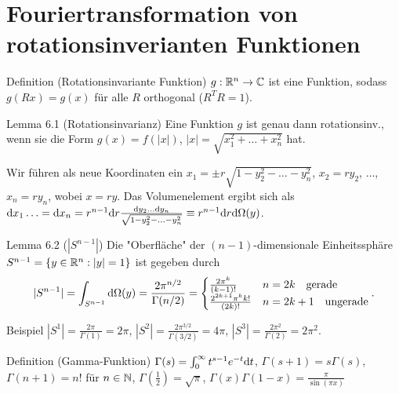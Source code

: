 \section{Fouriertransformation von rotationsinverianten Funktionen}

\begin{namedtheorem}{Definition (Rotationsinvariante Funktion)}
  $g:\mathbb{R}^n\rightarrow\mathbb{C}$ ist eine Funktion, sodass $g(Rx)=g(x)$ für alle $R$ orthogonal ($R^TR=1$).
\end{namedtheorem}

\begin{namedtheorem}{Lemma 6.1 (Rotationsinvarianz)}
  Eine Funktion $g$ ist genau dann rotationsinv., wenn sie die Form $g(x) = f(|x|)$, $|x| = \sqrt{x_1^2+\ldots+x_n^2}$ hat.
\end{namedtheorem}

Wir führen als neue Koordinaten ein $x_1 = \pm r\sqrt{1-y_2^2-\ldots-y_n^2}$, $x_2=ry_2$, $\ldots$, $x_n=ry_n$, wobei $x=ry$. Das Volumenelement ergibt sich als $\mathrm{d} x_1 \ldots = \mathrm{d} x_n = r^{n-1}\mathrm{d} r\frac{\mathrm{d} y_2 \ldots \mathrm{d} y_n}{\sqrt{1-y_2^2-\ldots-y_n^2}}\equiv r^{n-1}\mathrm{d} r \mathrm{d}\Omega(y)$.

\begin{namedtheorem}{Lemma 6.2 ($|S^{n-1}|$)}
  Die "Oberfläche" der $(n-1)$-dimensionale Einheitssphäre $S^{n-1} = \{y\in\mathbb{R}^n: |y| = 1\}$ ist gegeben durch
  \begin{align*}
    |S^{n-1}| = \int_{S^{n-1}} \mathrm{d} \Omega(y) = \frac{2\pi^{n/2}}{\Gamma(n/2)} = \begin{cases}
      \frac{2\pi^k}{(k-1)!} & n=2k \quad \text{gerade} \\
      \frac{2^{2k+1}\pi^kk!}{(2k)!} & n = 2k+1 \quad \text{ungerade}
    \end{cases}.
  \end{align*}
\end{namedtheorem}

\begin{namedtheorem}{Beispiel}
  $|S^1|=\frac{2\pi}{\Gamma(1)}=2\pi$, $|S^2|=\frac{2\pi^{3/2}}{\Gamma(3/2)}=4\pi$, $|S^3|=\frac{2\pi^2}{\Gamma(2)}=2\pi^2$.
\end{namedtheorem}

\begin{namedtheorem}{Definition (Gamma-Funktion)}
  $\Gamma(s)=\int_0^{\infty}t^{s-1}e^{-t}\mathrm{d} t$, $\Gamma(s+1)=s\Gamma(s)$, $\Gamma(n+1)=n!$ für $n\in\mathbb{N}$, $\Gamma(\frac12)=\sqrt{\pi}$, $\Gamma(x) \Gamma(1 - x) = \frac{\pi}{\sin(\pi x)}$
\end{namedtheorem}

